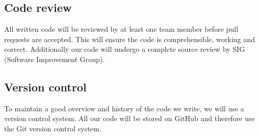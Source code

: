 \subsection{Code review}
All written code will be reviewed by at least one team member before pull requests are accepted. This will ensure the code is comprehensible, working and correct. Additionally our code will undergo a complete source review by SIG (Software Improvement Group).

\subsection{Version control}
To maintain a good overview and history of the code we write, we will use a version control system. All our code will be stored on GitHub and therefore use the Git version control system.
